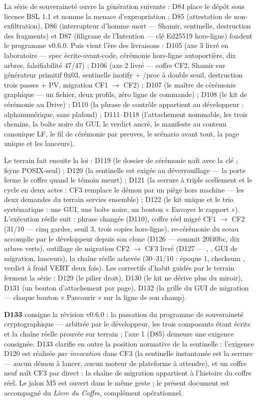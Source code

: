 La série de souveraineté ouvre la génération suivante : D84 place le dépôt sous licence
BSL 1.1 et nomme la menace d'expropriation ; D85 (attestation de non-exfiltration), D86
(interrupteur d'homme mort — Shamir, sentinelle, destruction des fragments) et D87
(filigrane de l'Intention — clé Ed25519 hors-ligne) fondent le programme v0.6.0. Puis
vient l'ère des livraisons : D105 (axe 3 livré en laboratoire — spec écrite-avant-code,
cérémonie hors-ligne autoportière, dix arbres, falsifiabilité 47/47) ; D106 (axe 2 livré
— coffre CF2, Shamir sur générateur primitif 0x03, sentinelle inotify + /proc à double
seuil, destruction trois passes + PV, migration CF1 $\to$ CF2) ; D107 (le maître de
cérémonie graphique — un fichier, deux profils, zéro ligne de commande) ; D108 (le kit
de cérémonie au Drive) ; D110 (la phrase de contrôle appartient au développeur :
alphanumérique, sans plafond) ; D111--D118 (l'attachement nommable, les trois chemins,
la boîte noire du GUI, le verdict ancré, le manifeste au contenu canonique LF, le fil
de cérémonie par preuves, le scénario avant tout, la page unique et les lanceurs).

Le terrain fait ensuite la loi : D119 (le dossier de cérémonie naît avec la clé ; fsync
POSIX-seul) ; D120 (la sentinelle est exigée au déverrouillage — la porte ferme le
coffre quand le témoin meurt) ; D121 (la serrure à triple scellement et le cycle en deux
actes : CF3 remplace le démon par un piège hors machine — les deux demandes du terrain
servies ensemble) ; D122 (le kit unique et le trio systématique : une GUI, une boîte
noire, un bouton « Envoyer le rapport »). L'exécution réelle suit : phrase changée
(D110), coffre réel migré CF1 $\to$ CF2 (31/10 — cinq gardes, seuil 3, trois copies
hors-ligne), re-cérémonie du sceau accomplie par le développeur depuis son clone
(D126 — commit 20f40bc, dix arbres verts), outillage de migration CF2 $\to$ CF3 livré
(D127 — , , GUI de migration, lanceurs), la chaîne
réelle achevée (30--31/10 : époque 1, checksum , verdict à froid VERT
deux fois). Les correctifs d'habit guidés par le terrain ferment la série : D129 (le
pilier droit), D130 (le kit ne dérive plus du miroir), D131 (un bouton d'attachement
par page), D132 (la grille du GUI de migration — chaque bouton « Parcourir » sur la
ligne de son champ).

\textbf{D133} consigne la révision v0.6.0 : la passation du programme de
souveraineté cryptographique — arbitrée par le développeur, les trois composants étant
écrits et la chaîne réelle prouvée sur terrain ; l'axe 1 (D85) demeure une exigence
consignée. D133 clarifie en outre la position normative de la sentinelle : l'exigence
D120 est réalisée \emph{par invocation} dans CF3 (la sentinelle instantanée est la
serrure — aucun démon à lancer, aucun moteur de plateforme à attendre), et un coffre
neuf naît CF3 par  direct : la chaîne de migration appartient à l'histoire du
coffre réel. Le jalon M5 est ouvert dans le même geste ; le présent document est
accompagné du \emph{Livre du Coffre}, complément opérationnel.

